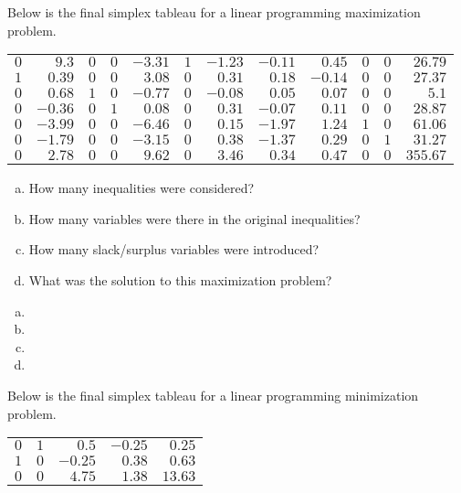\documentclass[11pt,letterpaper]{article}
\begin{document}
 Below is the final simplex tableau for a linear programming maximization problem. \par
	\begin{table}[H]
	\centering
	\begin{tabular}{rrrrrrrrrrrr}
	$0$ & $9.3$ & $0$ & $0$ & $-3.31$ & $1$ & $-1.23$ & $-0.11$ & $0.45$ & $0$ & $0$ & $26.79$ \\
	$1$ & $0.39$ & $0$ & $0$ & $3.08$ & $0$ & $0.31$ & $0.18$ & $-0.14$ & $0$ & $0$ & $27.37$ \\
	$0$ & $0.68$ & $1$ & $0$ & $-0.77$ & $0$ & $-0.08$ & $0.05$ & $0.07$ & $0$ & $0$ & $5.1$ \\
	$0$ & $-0.36$ & $0$ & $1$ & $0.08$ & $0$ & $0.31$ & $-0.07$ & $0.11$ & $0$ & $0$ & $28.87$ \\
	$0$ & $-3.99$ & $0$ & $0$ & $-6.46$ & $0$ & $0.15$ & $-1.97$ & $1.24$ & $1$ & $0$ & $61.06$ \\
	$0$ & $-1.79$ & $0$ & $0$ & $-3.15$ & $0$ & $0.38$ & $-1.37$ & $0.29$ & $0$ & $1$ & $31.27$ \\
	$0$ & $2.78$ & $0$ & $0$ & $9.62$ & $0$ & $3.46$ & $0.34$ & $0.47$ & $0$ & $0$ & $355.67$
	\end{tabular}
	\end{table}

\begin{enumerate}[(a)]
\item How many inequalities were considered?
\item How many variables were there in the original inequalities?
\item How many slack/surplus variables were introduced?
\item What was the solution to this maximization problem?
\end{enumerate} \pspace

\sol 
\begin{enumerate}[(a)]
\item 
\item 
\item 
\item 
\end{enumerate}



\newpage



 Below is the final simplex tableau for a linear programming minimization problem. \par
	\begin{table}[H]
	\centering
	\begin{tabular}{rrrrr}
	$0$ & $1$ & $0.5$ & $-0.25$ & $0.25$ \\
	$1$ & $0$ & $-0.25$ & $0.38$ & $0.63$ \\
	$0$ & $0$ & $4.75$ & $1.38$ & $13.63$
	\end{tabular}
	\end{table}
\end{document}

